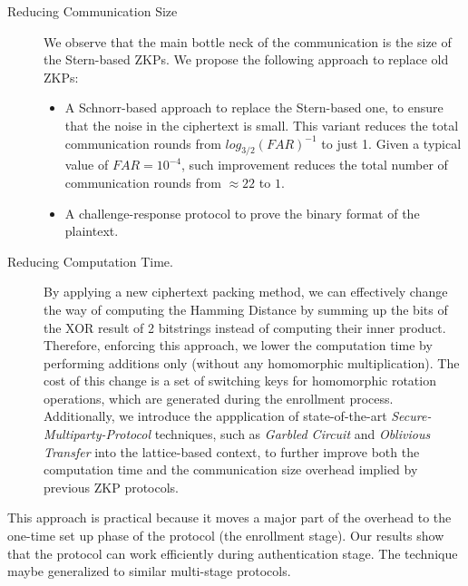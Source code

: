 \begin{description}
\item[Reducing Communication Size] We observe that the main bottle neck of the
  communication is the size of the Stern-based ZKPs. We propose the
  following approach to replace old ZKPs:
  \begin{itemize}
  \item A Schnorr-based approach to replace the Stern-based one, to ensure that
    the noise in the ciphertext is small. This variant reduces the total
    communication rounds from \(log_{3/2}(FAR)^{-1}\) to just 1. Given a typical
    value of $FAR = 10^{-4}$, such improvement reduces the total number of
    communication rounds from $\approx 22$ to $1$.
  \item A challenge-response protocol to prove the binary format of the
    plaintext.
  \end{itemize}
\item[Reducing Computation Time.] By applying a new ciphertext packing
  method, we can effectively change the way of computing the Hamming Distance by
  summing up the bits of the XOR result of 2 bitstrings instead of computing their
  inner product. Therefore, enforcing this approach, we lower the computation time by performing
  additions only (without any homomorphic multiplication). The cost of this change
  is a set of switching keys for homomorphic rotation operations, which are
  generated during the enrollment process. Additionally, we introduce the
  appplication of state-of-the-art \textit{Secure-Multiparty-Protocol}
  techniques, such as \textit{Garbled Circuit} and \textit{Oblivious Transfer} into
  the lattice-based context, to further improve both the computation time and
  the communication size overhead implied by previous ZKP protocols.
\end{description}
This approach is practical because it moves a major part of the overhead to the
one-time set up phase of the protocol (the enrollment stage). Our results show
that the protocol can work efficiently during authentication stage. The
technique maybe generalized to similar multi-stage protocols.

